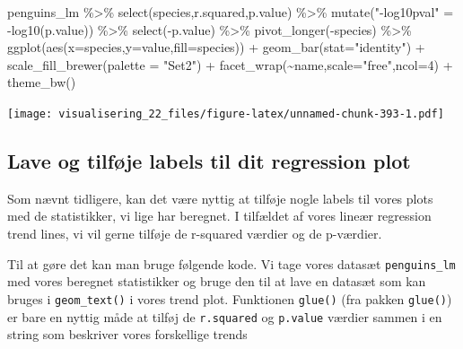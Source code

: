 \documentclass[
]{book}
\newenvironment{Shaded}{\begin{snugshade}}{\end{snugshade}}
\newcommand{\AttributeTok}[1]{\textcolor[rgb]{0.77,0.63,0.00}{#1}}
\newcommand{\DecValTok}[1]{\textcolor[rgb]{0.00,0.00,0.81}{#1}}
\newcommand{\FunctionTok}[1]{\textcolor[rgb]{0.00,0.00,0.00}{#1}}
\newcommand{\NormalTok}[1]{#1}
\newcommand{\OtherTok}[1]{\textcolor[rgb]{0.56,0.35,0.01}{#1}}
\newcommand{\SpecialCharTok}[1]{\textcolor[rgb]{0.00,0.00,0.00}{#1}}
\newcommand{\StringTok}[1]{\textcolor[rgb]{0.31,0.60,0.02}{#1}}
\begin{document}
\begin{Shaded}
\begin{Highlighting}[]
\NormalTok{penguins\_lm }\SpecialCharTok{\%\textgreater{}\%} 
  \FunctionTok{select}\NormalTok{(species,r.squared,p.value) }\SpecialCharTok{\%\textgreater{}\%}
  \FunctionTok{mutate}\NormalTok{(}\StringTok{"{-}log10pval"} \OtherTok{=} \SpecialCharTok{{-}}\FunctionTok{log10}\NormalTok{(p.value)) }\SpecialCharTok{\%\textgreater{}\%}
  \FunctionTok{select}\NormalTok{(}\SpecialCharTok{{-}}\NormalTok{p.value) }\SpecialCharTok{\%\textgreater{}\%}
  \FunctionTok{pivot\_longer}\NormalTok{(}\SpecialCharTok{{-}}\NormalTok{species) }\SpecialCharTok{\%\textgreater{}\%}
  \FunctionTok{ggplot}\NormalTok{(}\FunctionTok{aes}\NormalTok{(}\AttributeTok{x=}\NormalTok{species,}\AttributeTok{y=}\NormalTok{value,}\AttributeTok{fill=}\NormalTok{species)) }\SpecialCharTok{+} 
  \FunctionTok{geom\_bar}\NormalTok{(}\AttributeTok{stat=}\StringTok{"identity"}\NormalTok{) }\SpecialCharTok{+} 
  \FunctionTok{scale\_fill\_brewer}\NormalTok{(}\AttributeTok{palette =} \StringTok{"Set2"}\NormalTok{) }\SpecialCharTok{+}
  \FunctionTok{facet\_wrap}\NormalTok{(}\SpecialCharTok{\textasciitilde{}}\NormalTok{name,}\AttributeTok{scale=}\StringTok{"free"}\NormalTok{,}\AttributeTok{ncol=}\DecValTok{4}\NormalTok{) }\SpecialCharTok{+}
  \FunctionTok{theme\_bw}\NormalTok{()}
\end{Highlighting}
\end{Shaded}

\texttt{[image: visualisering\_22\_files/figure-latex/unnamed-chunk-393-1.pdf]}

\hypertarget{lave-og-tilfuxf8je-labels-til-dit-regression-plot}{%
\subsection{Lave og tilføje labels til dit regression plot}\label{lave-og-tilfuxf8je-labels-til-dit-regression-plot}}

Som nævnt tidligere, kan det være nyttig at tilføje nogle labels til vores plots med de statistikker, vi lige har beregnet. I tilfældet af vores lineær regression trend lines, vi vil gerne tilføje de r-squared værdier og de p-værdier.

Til at gøre det kan man bruge følgende kode. Vi tage vores datasæt \texttt{penguins\_lm} med vores beregnet statistikker og bruge den til at lave en datasæt som kan bruges i \texttt{geom\_text()} i vores trend plot. Funktionen \texttt{glue()} (fra pakken \texttt{glue()}) er bare en nyttig måde at tilføj de \texttt{r.squared} og \texttt{p.value} værdier sammen i en string som beskriver vores forskellige trends
\end{document}
